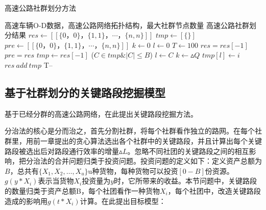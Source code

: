 				\begin{algorithm}[h]
		        \caption{高速公路社群划分方法}  
		        \label{shequn}
		        \begin{algorithmic}[1] %
		            \Require 高速车辆O-D数据，高速公路网络拓扑结构，最大社群节点数量
		            \Ensure 高速公路社群划分结果
		                \State $res\gets [[\{0，0\}，\{1,1\}，\cdots，\{n,n\}]]$ 
		                \State $tmp\gets [\{\}]$
		                \State $pre\gets [[\{0，0\}，\{1,1\}，\cdots，\{n,n\}]]$ 
		                \State $k\gets 0$  
		                \State $l\gets 0$
		                \State $T\gets 100$  
		                	\State $res=res[-1]$
		                	\State $pre=res$
			                	\State $tmp\gets res[-1]$  
			                		\For($C \in tmp \& |C| \le B$)
				                        	\State $l\gets C$  
				                        	\State $k\gets {\vartriangle Q}$  
			                    		\EndIf	
			                		\EndFor
			                    	\State $tmp[l] \gets i$ 
			                	\EndFor
			                	\State $res \ add \ tmp$
		                	\EndWhile
		                	\State T--
		                \EndWhile  
		                \State {}  
		            \EndFunction  
		        \end{algorithmic}  
		    	\end{algorithm} 

		\subsection{基于社群划分的关键路段挖掘模型}
				基于已经分群的高速公路网络，在此提出关键路段挖掘方法。

				分治法的核心是分而治之，首先分割社群，将每个社群看作独立的路网。在每个社群里，用前一章提出的贪心算法选出各个社群中的关键路段，并且计算出每个关键路段被选出后对路段通行效率的增量$\vartriangle L$。忽略不同社团的关键路段之间的相互影响，把分治法的合并问题归类于投资问题。投资问题的定义如下：定义资产总额为$B$，总共有$\{X_1,X_2,\dots,X_u\}$u种货物，每种货物可以投资$[0-B]$份资源。$g(y*X_{i})$表示当货物$X_i$投资量为$y$时，它所带来的收益。本节问题中，关键路段的数量归类于资产总额B，每个社团看作一种货物$X_i$，每个社团中，改造关键路段造成的影响用$g(t*X_{i})$计算。在此提出目标模型：

